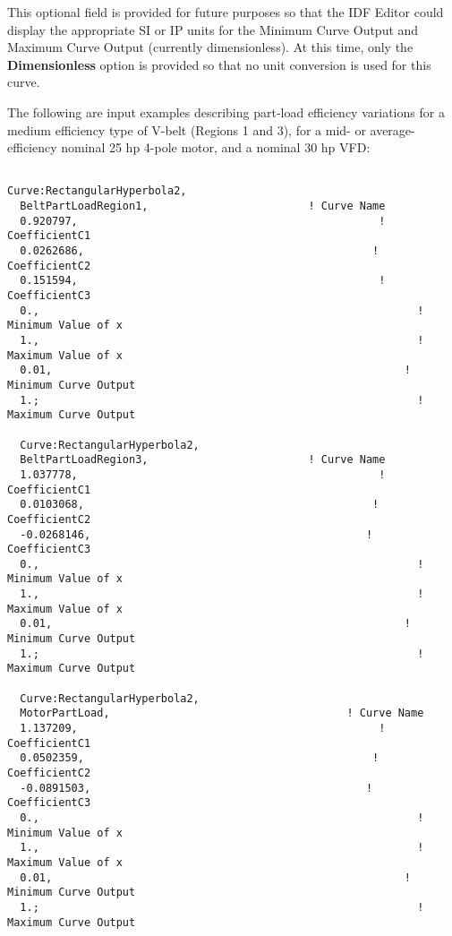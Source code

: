 This optional field is provided for future purposes so that the IDF Editor could display the appropriate SI or IP units for the Minimum Curve Output and Maximum Curve Output (currently dimensionless). At this time, only the \textbf{Dimensionless} option is provided so that no unit conversion is used for this curve.

The following are input examples describing part-load efficiency variations for a medium efficiency type of V-belt (Regions 1 and 3), for a mid- or average-efficiency nominal 25 hp 4-pole motor, and a nominal 30 hp VFD:

\begin{lstlisting}

Curve:RectangularHyperbola2,
  BeltPartLoadRegion1,                         ! Curve Name
  0.920797,                                               ! CoefficientC1
  0.0262686,                                             ! CoefficientC2
  0.151594,                                               ! CoefficientC3
  0.,                                                           ! Minimum Value of x
  1.,                                                           ! Maximum Value of x
  0.01,                                                       ! Minimum Curve Output
  1.;                                                           ! Maximum Curve Output

  Curve:RectangularHyperbola2,
  BeltPartLoadRegion3,                         ! Curve Name
  1.037778,                                               ! CoefficientC1
  0.0103068,                                             ! CoefficientC2
  -0.0268146,                                           ! CoefficientC3
  0.,                                                           ! Minimum Value of x
  1.,                                                           ! Maximum Value of x
  0.01,                                                       ! Minimum Curve Output
  1.;                                                           ! Maximum Curve Output

  Curve:RectangularHyperbola2,
  MotorPartLoad,                                     ! Curve Name
  1.137209,                                               ! CoefficientC1
  0.0502359,                                             ! CoefficientC2
  -0.0891503,                                           ! CoefficientC3
  0.,                                                           ! Minimum Value of x
  1.,                                                           ! Maximum Value of x
  0.01,                                                       ! Minimum Curve Output
  1.;                                                           ! Maximum Curve Output


\end{lstlisting}
